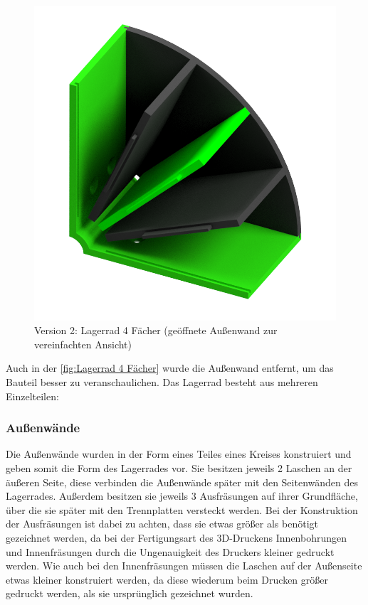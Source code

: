 \begin{figure}[H]
    \centering
    \includegraphics[scale=0.5,page=1]{fig/mech/LagerradSingle}
    \caption{Version 2: Lagerrad 4 Fächer (geöffnete Außenwand zur vereinfachten Ansicht)}
    \label{fig:Lagerrad 4 Fächer}
\end{figure}


Auch in der \autoref{fig:Lagerrad 4 Fächer} wurde die Außenwand entfernt, um das Bauteil besser zu veranschaulichen.
Das Lagerrad besteht aus mehreren Einzelteilen:

\subsubsection{Außenwände}
Die Außenwände wurden in der Form eines Teiles eines Kreises konstruiert und geben somit die Form des Lagerrades vor. Sie besitzen jeweils 2 Laschen an der äußeren Seite, diese verbinden die Außenwände später mit den Seitenwänden des Lagerrades.
Außerdem besitzen sie jeweils 3 Ausfräsungen auf ihrer Grundfläche, über die sie später mit den Trennplatten versteckt werden. Bei der Konstruktion der Ausfräsungen ist dabei zu achten, dass sie etwas größer als benötigt gezeichnet werden, da bei der
Fertigungsart des 3D-Druckens Innenbohrungen und Innenfräsungen durch die Ungenauigkeit des Druckers kleiner gedruckt werden. Wie auch bei den Innenfräsungen müssen die Laschen auf der Außenseite etwas kleiner konstruiert werden, da diese wiederum beim
Drucken größer gedruckt werden, als sie ursprünglich gezeichnet wurden.


